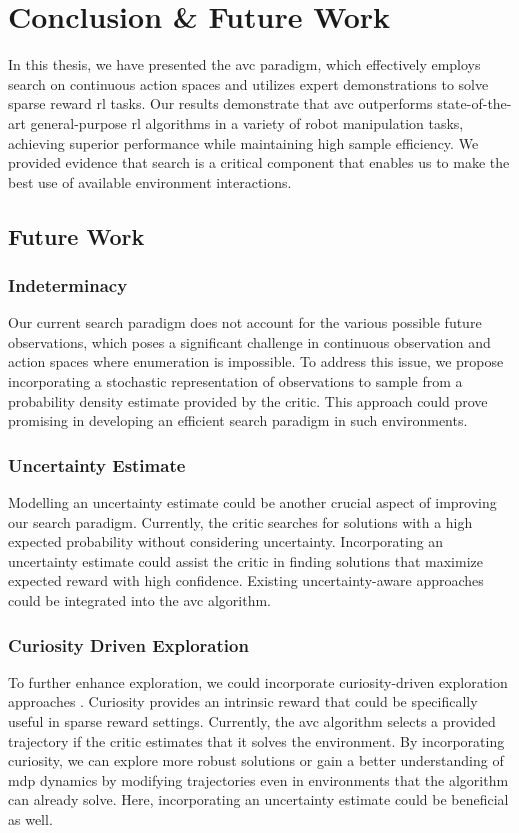 
\chapter{Conclusion & Future Work}
\label{chapter:Conc_Fut}
In this thesis, we have presented the \ac{avc} paradigm, which effectively employs search on continuous action spaces and utilizes 
expert demonstrations to solve sparse reward \ac{rl} tasks. Our results demonstrate that \ac{avc} 
outperforms state-of-the-art general-purpose \ac{rl} algorithms in a variety of robot manipulation tasks, achieving superior performance 
while maintaining high sample efficiency. We provided evidence that search is a critical component that enables us to make the best use of available 
environment interactions.

\section{Future Work}
\subsection{Indeterminacy}
Our current search paradigm does not account for the various possible future observations, which poses a significant challenge in 
continuous observation and action spaces where enumeration is impossible. To address this issue, we propose incorporating a stochastic 
representation of observations to sample from a probability density estimate provided by the critic. 
This approach could prove promising in developing an efficient search paradigm in such environments.

\subsection{Uncertainty Estimate}
Modelling an uncertainty estimate could be another crucial aspect of improving our search paradigm. 
Currently, the critic searches for solutions with a high expected probability without considering uncertainty. 
Incorporating an uncertainty estimate could assist the critic in finding solutions that maximize expected reward with high confidence. 
Existing uncertainty-aware approaches \cite{gawlikowski2022survey,liu2022simple} 
could be integrated into the \ac{avc} algorithm.

\subsection{Curiosity Driven Exploration}
To further enhance exploration, we could incorporate curiosity-driven exploration approaches \cite{pathak2017curiositydriven}. 
Curiosity provides an intrinsic reward that could be specifically useful in sparse reward settings. 
Currently, the \ac{avc} algorithm selects a provided trajectory if the critic estimates that it solves the environment. By incorporating curiosity, 
we can explore more robust solutions or gain a better understanding of \ac{mdp} dynamics by modifying trajectories even in environments that the 
algorithm can already solve. Here, incorporating an uncertainty estimate could be beneficial as well.
